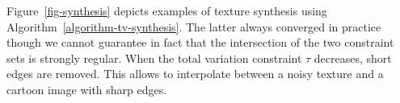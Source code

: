 \documentclass[11pt,nofonttune,a4paper]{IEEEtran}
\begin{document}
Figure~\ref{fig-synthesis} depicts examples of texture synthesis using Algorithm~\ref{algorithm-tv-synthesis}. The latter always converged in practice though we cannot guarantee in fact that the intersection of the two constraint sets is strongly regular. When the total variation constraint $\tau$ decreases, short edges are removed. This allows to interpolate between a noisy texture and a cartoon image with sharp edges. 

\end{document}
